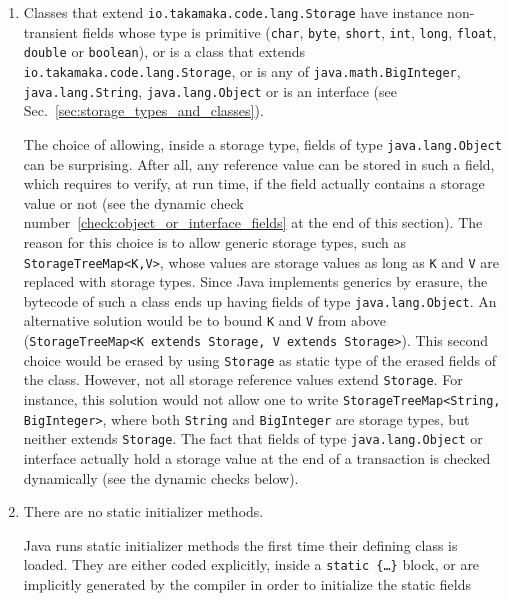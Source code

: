 \begin{enumerate}
	or to instance methods of a (non-strict) subclass of
	\texttt{io.takamaka.code.lang.Contract} or of an interface.
\item Classes that extend \texttt{io.takamaka.code.lang.Storage}
	have instance non-transient
    fields whose type is primitive (\texttt{char}, \texttt{byte}, \texttt{short}, \texttt{int},
	\texttt{long}, \texttt{float},
    \texttt{double} or \texttt{boolean}), or is a class that extends \texttt{io.takamaka.code.lang.Storage},
    or is any of
    \texttt{java.math.BigInteger}, \texttt{java.lang.String}, \texttt{java.lang.Object} or is an interface
    (see Sec.~\ref{sec:storage_types_and_classes}).
%
\begin{commentbox}
The choice of allowing, inside a storage type, fields of type
\texttt{java.lang.Object} can be surprising. After all, any reference value can be
stored in such a field, which requires to verify, at run time, if the field
actually contains a storage value or not (see the dynamic check number~\ref{check:object_or_interface_fields} at the end of this section).
The reason for this choice is to allow generic storage types, such as
\texttt{StorageTreeMap<K,V>}, whose values are storage values as long as \texttt{K} and \texttt{V}
are replaced with storage types. Since Java implements generics by erasure,
the bytecode of such a class ends up having fields of type \texttt{java.lang.Object}. An alternative
solution would be to bound \texttt{K} and \texttt{V} from above
(\texttt{StorageTreeMap<K extends Storage, V extends Storage>}). This second choice
would be erased by using \texttt{Storage} as static type of the erased fields of the
class. However, not all storage reference values extend \texttt{Storage}. For instance,
this solution would not allow one to write \texttt{StorageTreeMap<String, BigInteger>}, where
both \texttt{String} and \texttt{BigInteger} are storage types, but neither extends \texttt{Storage}.
The fact that fields of type \texttt{java.lang.Object} or interface actually hold a
storage value at the end of a transaction is checked dynamically (see the dynamic checks below).
\end{commentbox}
%
\item There are no static initializer methods.
%
\begin{commentbox}
Java runs static initializer methods the first time their defining class is loaded. They
are either coded explicitly, inside a \texttt{static \{\ldots\}} block, or are
implicitly generated by the compiler in order to initialize the static fields

\end{commentbox}
\end{enumerate}
